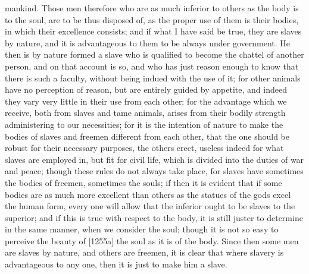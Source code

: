 mankind. Those men therefore who are as much inferior to others as the
body is to the soul, are to be thus disposed of, as the proper use of them
is their bodies, in which their excellence consists; and if what I have
said be true, they are slaves by nature, and it is advantageous to them to
be always under government. He then is by nature formed a slave who is
qualified to become the chattel of another person, and on that account is
so, and who has just reason enough to know that there is such a faculty,
without being indued with the use of it; for other animals have no
perception of reason, but are entirely guided by appetite, and indeed they
vary very little in their use from each other; for the advantage which we
receive, both from slaves and tame animals, arises from their bodily
strength administering to our necessities; for it is the intention of
nature to make the bodies of slaves and freemen different from each other,
that the one should be robust for their necessary purposes, the others
erect, useless indeed for what slaves are employed in, but fit for civil
life, which is divided into the duties of war and peace; though these
rules do not always take place, for slaves have sometimes the bodies of
freemen, sometimes the souls; if then it is evident that if some bodies
are as much more excellent than others as the statues of the gods excel
the human form, every one will allow that the inferior ought to be slaves
to the superior; and if this is true with respect to the body, it is still
juster to determine in the same manner, when we consider the soul; though
it is not so easy to perceive the beauty of [1255a] the soul as it is of
the body. Since then some men are slaves by nature, and others are
freemen, it is clear that where slavery is advantageous to any one, then
it is just to make him a slave.


